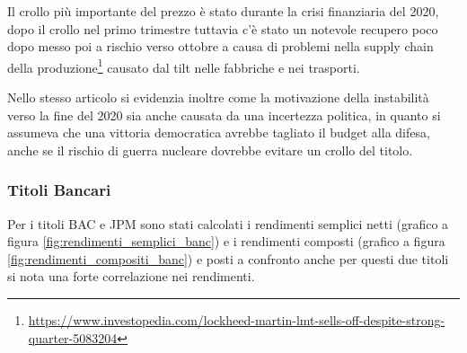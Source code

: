 \documentclass{article}
\begin{document}
Il crollo più importante del prezzo è stato durante la crisi finanziaria del 2020, dopo il crollo nel primo trimestre tuttavia c'è stato un notevole recupero poco dopo messo poi a rischio verso ottobre a causa di problemi nella supply chain della
produzione\footnote{
  \href{https://www.investopedia.com/lockheed-martin-lmt-sells-off-despite-strong-quarter-5083204}{https://www.investopedia.com/lockheed-martin-lmt-sells-off-despite-strong-quarter-5083204}
}
causato dal tilt nelle fabbriche e nei trasporti.

Nello stesso articolo si evidenzia inoltre come la motivazione della instabilità verso la fine del 2020 sia anche causata da una incertezza politica, in quanto si assumeva che una vittoria democratica avrebbe tagliato il
budget alla difesa, anche se il rischio di guerra nucleare dovrebbe evitare un crollo del titolo.

\subsubsection{Titoli Bancari}

Per i titoli BAC e JPM sono stati calcolati i rendimenti semplici netti (grafico a figura \ref{fig:rendimenti_semplici_banc}) e i rendimenti composti (grafico a figura \ref{fig:rendimenti_compositi_banc}) e posti a confronto
anche per questi due titoli si nota una forte correlazione nei rendimenti.
\end{document}
